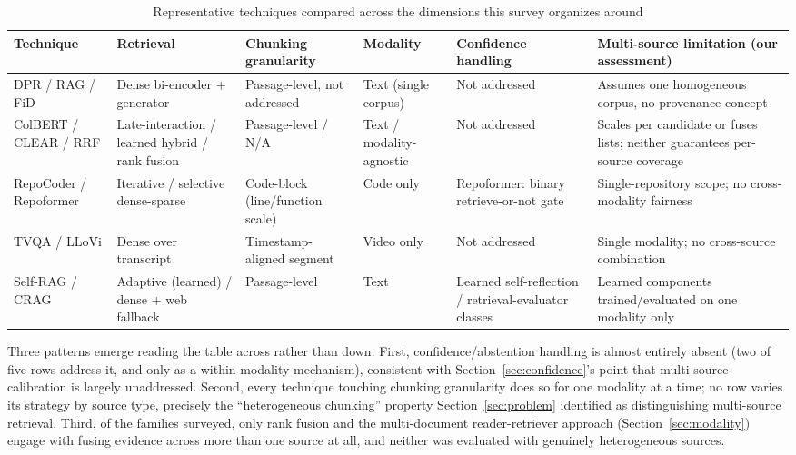 \documentclass[conference]{IEEEtran}
\begin{document}
\begin{table}[t]
\caption{Representative techniques compared across the dimensions this survey organizes around}
\label{tab:synthesis}
\centering
\scriptsize
\begin{tabular}{@{}>{\raggedright\arraybackslash}p{2.6cm}>{\raggedright\arraybackslash}p{2.2cm}>{\raggedright\arraybackslash}p{2.0cm}>{\raggedright\arraybackslash}p{1.6cm}>{\raggedright\arraybackslash}p{2.4cm}>{\raggedright\arraybackslash}p{3.6cm}@{}}
\toprule
Technique & Retrieval & Chunking granularity & Modality & Confidence handling & Multi-source limitation (our assessment) \\
\midrule
DPR / RAG / FiD \cite{karpukhin2020dpr,lewis2020rag,izacard2021fid} & Dense bi-encoder + generator & Passage-level, not addressed & Text (single corpus) & Not addressed & Assumes one homogeneous corpus, no provenance concept \\
ColBERT / CLEAR / RRF \cite{khattab2020colbert,gao2020clear,cormack2009rrf} & Late-interaction / learned hybrid / rank fusion & Passage-level / N/A & Text / modality-agnostic & Not addressed & Scales per candidate or fuses lists; neither guarantees per-source coverage \\
RepoCoder / Repoformer \cite{zhang2023repocoder,wu2024repoformer} & Iterative / selective dense-sparse & Code-block (line/function scale) & Code only & Repoformer: binary retrieve-or-not gate & Single-repository scope; no cross-modality fairness \\
TVQA / LLoVi \cite{lei2018tvqa,zhang2024llovi} & Dense over transcript & Timestamp-aligned segment & Video only & Not addressed & Single modality; no cross-source combination \\
Self-RAG / CRAG \cite{asai2024selfrag,yan2024crag} & Adaptive (learned) / dense + web fallback & Passage-level & Text & Learned self-reflection / retrieval-evaluator classes & Learned components trained/evaluated on one modality only \\
\bottomrule
\end{tabular}
\end{table}

Three patterns emerge reading the table across rather than down. First, confidence/abstention handling is almost entirely absent (two of five rows address it, and only as a within-modality mechanism), consistent with Section~\ref{sec:confidence}'s point that multi-source calibration is largely unaddressed. Second, every technique touching chunking granularity does so for one modality at a time; no row varies its strategy by source type, precisely the ``heterogeneous chunking'' property Section~\ref{sec:problem} identified as distinguishing multi-source retrieval. Third, of the families surveyed, only rank fusion and the multi-document reader-retriever approach (Section~\ref{sec:modality}) engage with fusing evidence across more than one source at all, and neither was evaluated with genuinely heterogeneous sources.
\end{document}
